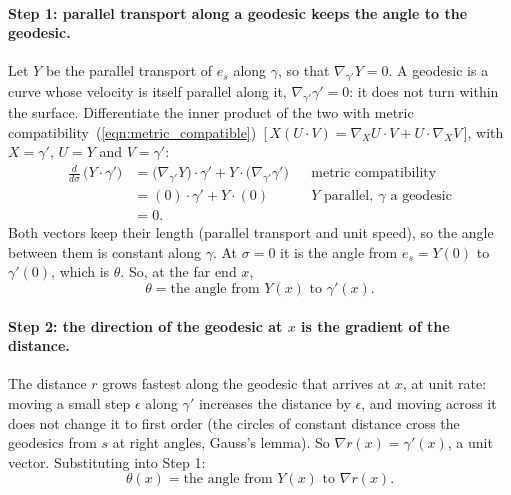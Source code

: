 \paragraph{Step 1: parallel transport along a geodesic keeps the angle to the geodesic.} Let $Y$ be the parallel transport of $e_s$ along $\gamma$, so that $\nabla_{\gamma'} Y = 0$. A geodesic is a curve whose velocity is itself parallel along it, $\nabla_{\gamma'}\gamma' = 0$: it does not turn within the surface. Differentiate the inner product of the two with metric compatibility~(\ref{eqn:metric_compatible})~[\,$X(U\cdot V) = \nabla_X U\cdot V + U\cdot\nabla_X V$\,], with $X = \gamma'$, $U = Y$ and $V = \gamma'$:
\begin{align*}
\frac{d}{d\sigma}\,\big(Y \cdot \gamma'\big) &= \big(\nabla_{\gamma'} Y\big)\cdot \gamma' + Y \cdot \big(\nabla_{\gamma'}\gamma'\big) && \text{metric compatibility} \\
&= (0)\cdot\gamma' + Y\cdot(0) && Y \text{ parallel},\ \gamma \text{ a geodesic} \\
&= 0 .
\end{align*}
Both vectors keep their length (parallel transport and unit speed), so the angle between them is constant along $\gamma$. At $\sigma = 0$ it is the angle from $e_s = Y(0)$ to $\gamma'(0)$, which is $\theta$. So, at the far end $x$,
\begin{equation*}
\theta = \text{the angle from } Y(x) \text{ to } \gamma'(x) .
\end{equation*}

\paragraph{Step 2: the direction of the geodesic at $x$ is the gradient of the distance.} The distance $r$ grows fastest along the geodesic that arrives at $x$, at unit rate: moving a small step $\epsilon$ along $\gamma'$ increases the distance by $\epsilon$, and moving across it does not change it to first order (the circles of constant distance cross the geodesics from $s$ at right angles, Gauss's lemma). So $\nabla r(x) = \gamma'(x)$, a unit vector. Substituting into Step 1:
\begin{equation*}
\theta(x) = \text{the angle from } Y(x) \text{ to } \nabla r(x) .
\end{equation*}

